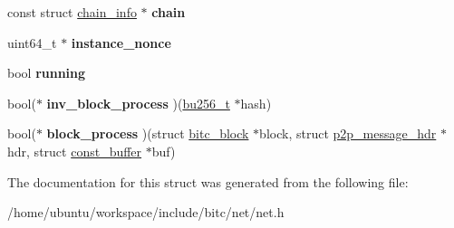 \begin{DoxyCompactItemize}
\item 
\hypertarget{structnet__child__info_ab6ee72882f9813d4e3d31e98ed9ddaef}{const struct \hyperlink{structchain__info}{chain\-\_\-info} $\ast$ {\bfseries chain}}\label{structnet__child__info_ab6ee72882f9813d4e3d31e98ed9ddaef}

\item 
\hypertarget{structnet__child__info_adbc9e7ec9aaa38f698072618fa39b171}{uint64\-\_\-t $\ast$ {\bfseries instance\-\_\-nonce}}\label{structnet__child__info_adbc9e7ec9aaa38f698072618fa39b171}

\item 
\hypertarget{structnet__child__info_aaf37da9f4fb518f3953c4d7d547894a2}{bool {\bfseries running}}\label{structnet__child__info_aaf37da9f4fb518f3953c4d7d547894a2}

\item 
\hypertarget{structnet__child__info_a3794a222d2d15ef9e68f0ad666bd130d}{bool($\ast$ {\bfseries inv\-\_\-block\-\_\-process} )(\hyperlink{structbu256}{bu256\-\_\-t} $\ast$hash)}\label{structnet__child__info_a3794a222d2d15ef9e68f0ad666bd130d}

\item 
\hypertarget{structnet__child__info_acfb19501be50bbd94a2b60c3d872976e}{bool($\ast$ {\bfseries block\-\_\-process} )(struct \hyperlink{structbitc__block}{bitc\-\_\-block} $\ast$block, struct \hyperlink{structp2p__message__hdr}{p2p\-\_\-message\-\_\-hdr} $\ast$hdr, struct \hyperlink{structconst__buffer}{const\-\_\-buffer} $\ast$buf)}\label{structnet__child__info_acfb19501be50bbd94a2b60c3d872976e}

\end{DoxyCompactItemize}


The documentation for this struct was generated from the following file\-:\begin{DoxyCompactItemize}
\item 
/home/ubuntu/workspace/include/bitc/net/net.\-h\end{DoxyCompactItemize}
